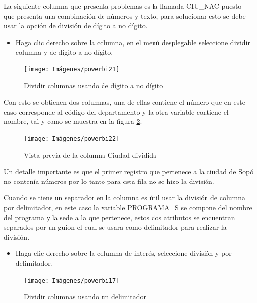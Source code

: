 \documentclass[
]{book}
\providecommand{\tightlist}{%
  \setlength{\itemsep}{0pt}\setlength{\parskip}{0pt}}
\begin{document}
La siguiente columna que presenta problemas es la llamada CIU\_NAC puesto que presenta una combinación de números y texto, para solucionar esto se debe usar la opción de división de dígito a no dígito.

\begin{itemize}
\tightlist
\item
  Haga clic derecho sobre la columna, en el menú desplegable seleccione dividir columna y de dígito a no dígito.
\end{itemize}

\begin{figure}

{\centering \texttt{[image: Imágenes/powerbi21]} 

}

\caption{Dividir columnas usando de dígito a no dígito}\label{fig:dividirdigitoanodigito-fig}
\end{figure}

Con esto se obtienen dos columnas, una de ellas contiene el número que en este caso corresponde al código del departamento y la otra variable contiene el nombre, tal y como se muestra en la figura \ref{fig:columnasdivididas-fig}.

\begin{figure}

{\centering \texttt{[image: Imágenes/powerbi22]} 

}

\caption{Vista previa de la columna Ciudad dividida}\label{fig:columnasdivididas-fig}
\end{figure}

Un detalle importante es que el primer registro que pertenece a la ciudad de Sopó no contenía números por lo tanto para esta fila no se hizo la división.

Cuando se tiene un separador en la columna es útil usar la división de columna por delimitador, en este caso la variable PROGRAMA\_S se compone del nombre del programa y la sede a la que pertenece, estos dos atributos se encuentran separados por un guion el cual se usara como delimitador para realizar la división.

\begin{itemize}
\tightlist
\item
  Haga clic derecho sobre la columna de interés, seleccione división y por delimitador.
\end{itemize}

\begin{figure}

{\centering \texttt{[image: Imágenes/powerbi17]} 

}

\caption{Dividir columnas usando un delimitador}\label{fig:columnasdivididasdelimitador-fig}
\end{figure}
\end{document}
